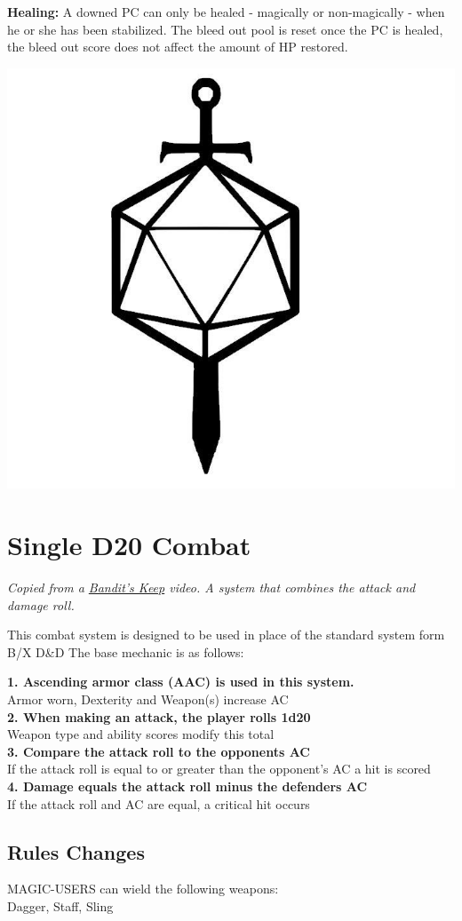 \documentclass[letterpaper,sansserif,tightsqueeze]{rpg-module}
\begin{document}
\textbf{Healing:} A downed PC can only be healed - magically or non-magically - when he or she has been stabilized. The bleed out pool is reset once the PC is healed, the bleed out score does not affect the amount of HP restored.\\

\vspace{0.5cm}

\begin{center}
	\includegraphics[width = 0.3\linewidth]{d20_weapons.jpg}
\end{center}
\section{Single D20 Combat}
\textit{Copied from a \href{https://www.youtube.com/watch?v=VflmXb0EAbI}{Bandit's Keep} video. A system that combines the attack and damage roll.}

This combat system is designed to be used in place of the standard system form B/X D\&D
The base mechanic is as follows:

\textbf{1. Ascending armor class (AAC) is used in this system.}\\
Armor worn, Dexterity and Weapon(s) increase AC\\
\textbf{2. When making an attack, the player rolls 1d20}\\
Weapon type and ability scores modify this total\\
\textbf{3. Compare the attack roll to the opponents AC}\\
If the attack roll is equal to or greater than the opponent's AC a hit is scored\\
\textbf{4. Damage equals the attack roll minus the defenders AC}\\
If the attack roll and AC are equal, a critical hit occurs

\vspace{0.5cm}

\subsection*{Rules Changes}
MAGIC-USERS can wield the following weapons:\\
Dagger, Staff, Sling
\end{document}
